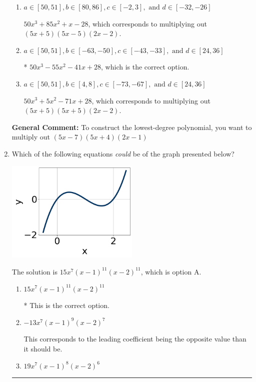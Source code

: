 \documentclass{extbook}[14pt]
\newcommand{\litem}[1]{\item #1

\rule{\textwidth}{0.4pt}}
\begin{document}
\begin{enumerate}
{\begin{enumerate}[label=\Alph*.]
$50x^{3} +55 x^{2} -41 x -28$, which corresponds to multiplying out $(5x + 7)(5x -4)(2x + 1)$.
\item \( a \in [50, 51], b \in [80, 86], c \in [-2, 3], \text{ and } d \in [-32, -26] \)

$50x^{3} +85 x^{2} +x -28$, which corresponds to multiplying out $(5x + 5)(5x -5)(2x -2)$.
\item \( a \in [50, 51], b \in [-63, -50], c \in [-43, -33], \text{ and } d \in [24, 36] \)

* $50x^{3} -55 x^{2} -41 x + 28$, which is the correct option.
\item \( a \in [50, 51], b \in [4, 8], c \in [-73, -67], \text{ and } d \in [24, 36] \)

$50x^{3} +5 x^{2} -71 x + 28$, which corresponds to multiplying out $(5x + 5)(5x + 5)(2x -2)$.
\end{enumerate}

\textbf{General Comment:} To construct the lowest-degree polynomial, you want to multiply out $(5x -7)(5x + 4)(2x -1)$
}
\litem{
Which of the following equations \textit{could} be of the graph presented below?

\begin{center}
    \includegraphics[width=0.5\textwidth]{../Figures/polyGraphToFunctionC.png}
\end{center}




The solution is \( 15x^{7} (x - 1)^{11} (x - 2)^{11} \), which is option A.\begin{enumerate}[label=\Alph*.]
\item \( 15x^{7} (x - 1)^{11} (x - 2)^{11} \)

* This is the correct option.
\item \( -13x^{7} (x - 1)^{9} (x - 2)^{7} \)

This corresponds to the leading coefficient being the opposite value than it should be.
\item \( 19x^{7} (x - 1)^{8} (x - 2)^{6} \)


\end{enumerate}}
\end{enumerate}
\end{document}
